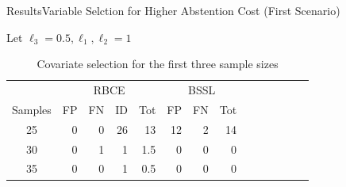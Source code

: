 \documentclass[aspectratio=169]{beamer}					%
\begin{document}
\begin{frame}{Results}{Variable Selction for Higher Abstention Cost (First Scenario)}

Let \alert{$\ell_3 = 0.5, \ell_1,\ell_2 = 1$}

\begin{table}[h]
    \centering
    \begin{tabular}{|c||rrr|r||rr|r||rr|r||rr|r|}
  \hline
  &\multicolumn{4}{c||}{RBCE}&\multicolumn{3}{c|}{BSSL}\\
  \cline{2-14}
 Samples & FP & FN & ID & Tot & FP & FN & Tot \\ 
  \hline
25 &   0 &   0 &  26 & 13 &  12 &   2 & 14\\ 
  30 &   0 &   1 &   1 & 1.5 &  0 &   0 & 0\\ 
  35 &   0 &   0 &   1 & 0.5 &  0 &   0 & 0\\ 
  \hline
\end{tabular}
\caption{Covariate selection for the first three sample sizes}
\end{table}


\end{frame}

\fi


\iffalse
\end{document}
